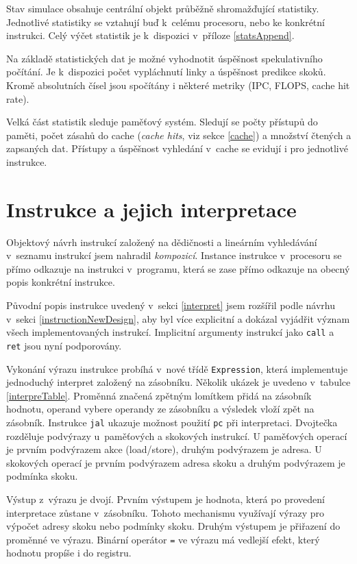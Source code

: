 Stav simulace obsahuje centrální objekt průběžně shromažďující statistiky.
Jednotlivé statistiky se vztahují buď k~celému procesoru, nebo ke konkrétní instrukci.
Celý výčet statistik je k~dispozici v~příloze \ref{statsAppend}.

Na základě statistických dat je možné vyhodnotit úspěšnost spekulativního počítání.
Je k~dispozici počet vypláchnutí linky a úspěšnost predikce skoků.
Kromě absolutních čísel jsou spočítány i některé metriky (IPC, FLOPS, cache hit rate).

Velká část statistik sleduje paměťový systém.
Sledují se počty přístupů do paměti, počet zásahů do cache (\emph{cache hits}, viz sekce \ref{cache}) a množství čtených a zapsaných dat.
Přístupy a úspěšnost vyhledání v~cache se evidují i pro jednotlivé instrukce.

\section{Instrukce a jejich interpretace}

Objektový návrh instrukcí založený na dědičnosti a lineárním vyhledávání v~seznamu instrukcí jsem nahradil \emph{kompozicí}.
Instance instrukce v~procesoru se přímo odkazuje na instrukci v~programu, která se zase přímo odkazuje na obecný popis konkrétní instrukce.

Původní popis instrukce uvedený v~sekci \ref{interpret} jsem rozšířil podle návrhu v~sekci \ref{instructionNewDesign}, aby byl více explicitní a dokázal vyjádřit význam všech implementovaných instrukcí.
Implicitní argumenty instrukcí jako \texttt{call} a \texttt{ret} jsou nyní podporovány.

Vykonání výrazu instrukce probíhá v~nové třídě \texttt{Expression}, která implementuje jednoduchý interpret založený na zásobníku.
Několik ukázek je uvedeno v~tabulce \ref{interpreTable}.
Proměnná značená zpětným lomítkem přidá na zásobník hodnotu, operand vybere operandy ze zásobníku a výsledek vloží zpět na zásobník.
Instrukce \texttt{jal} ukazuje možnost použití \texttt{pc} při interpretaci.
Dvojtečka rozděluje podvýrazy u~paměťových a skokových instrukcí.
U paměťových operací je prvním podvýrazem akce (load/store), druhým podvýrazem je adresa.
U skokových operací je prvním podvýrazem adresa skoku a druhým podvýrazem je podmínka skoku.

Výstup z~výrazu je dvojí.
Prvním výstupem je hodnota, která po provedení interpretace zůstane v~zásobníku.
Tohoto mechanismu využívají výrazy pro výpočet adresy skoku nebo podmínky skoku.
Druhým výstupem je přiřazení do proměnné ve výrazu.
Binární operátor \texttt{=} ve výrazu má vedlejší efekt, který hodnotu propíše i do registru.

